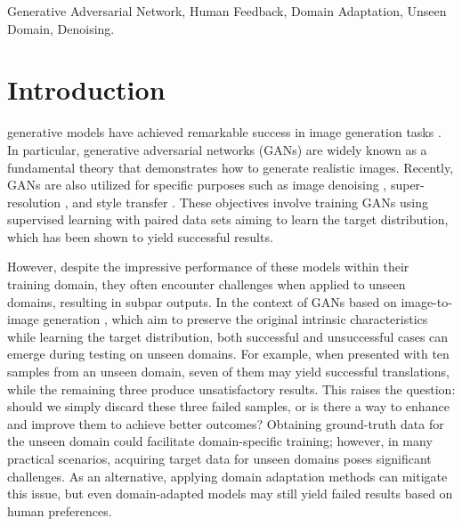 \documentclass[lettersize,journal]{IEEEtran}
\begin{document}
\begin{IEEEkeywords}
Generative Adversarial Network, Human Feedback, Domain Adaptation, Unseen Domain, Denoising.
\end{IEEEkeywords}

\section{Introduction}
 generative models have achieved remarkable success in image generation tasks \cite{goodfellow2020generative, DonahueKD17, mirza2014conditional}. In particular, generative adversarial networks (GANs) are widely known as a fundamental theory that demonstrates how to generate realistic images. Recently, GANs are also utilized for specific purposes such as image denoising \cite{zhang2017beyond, tran2020gan, vo2021hi}, super-resolution \cite{haris2018deep, wang2018esrgan}, and style transfer \cite{zhu2017unpaired, zhu2017toward, yi2017dualgan, liu2017unsupervised}. These objectives involve training GANs using supervised learning with paired data sets aiming to learn the target distribution, which has been shown to yield successful results.

However, despite the impressive performance of these models within their training domain, they often encounter challenges when applied to unseen domains, resulting in subpar outputs. In the context of GANs based on image-to-image generation \cite{tian2020deep}, which aim to preserve the original intrinsic characteristics while learning the target distribution, both successful and unsuccessful cases can emerge during testing on unseen domains. For example, when presented with ten samples from an unseen domain, seven of them may yield successful translations, while the remaining three produce unsatisfactory results. This raises the question: should we simply discard these three failed samples, or is there a way to enhance and improve them to achieve better outcomes? Obtaining ground-truth data for the unseen domain could facilitate domain-specific training; however, in many practical scenarios, acquiring target data for unseen domains poses significant challenges. As an alternative, applying domain adaptation methods \cite{volpi2018adversarial, wang2018transferring, kang2019contrastive, alanov2022hyperdomainnet, bousmalis2017unsupervised, lin2019real, chen2022reusing, kwon2023one} can mitigate this issue, but even domain-adapted models may still yield failed results based on human preferences.
\end{document}

